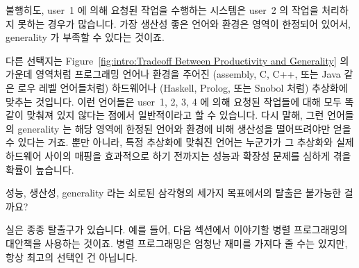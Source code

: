 불행히도, user~1 에 의해 요청된 작업을 수행하는 시스템은 user~2 의 작업을
처리하지 못하는 경우가 많습니다.
가장 생산성 좋은 언어와 환경은 영역이 한정되어 있어서, generality 가 부족할 수
있다는 것이죠.


다른 선택지는 Figure~\ref{fig:intro:Tradeoff Between Productivity and
Generality} 의 가운데 영역처럼 프로그래밍 언어나 환경을 주어진 (assembly, C,
C++, 또는 Java 같은 로우 레벨 언어들처럼) 하드웨어나 (Haskell, Prolog, 또는
Snobol 처럼) 추상화에 맞추는 것입니다.
이런 언어들은 user~1, 2, 3, 4 에 의해 요청된 작업들에 대해 모두 똑같이 맞춰져
있지 않다는 점에서 일반적이라고 할 수 있습니다.
다시 말해, 그런 언어들의 generality 는 해당 영역에 한정된 언어와 환경에 비해
생산성을 떨어뜨려야만 얻을 수 있다는 거죠.
뿐만 아니라, 특정 추상화에 맞춰진 언어는 누군가가 그 추상화와 실제 하드웨어
사이의 매핑을 효과적으로 하기 전까지는 성능과 확장성 문제를 심하게 겪을 확률이
높습니다.


성능, 생산성, generality 라는 쇠로된 삼각형의 세가지 목표에서의 탈출은 불가능한
걸까요?


실은 종종 탈출구가 있습니다. 예를 들어, 다음 섹션에서 이야기할 병렬
프로그래밍의 대안책을 사용하는 것이죠.
병렬 프로그래밍은 엄청난 재미를 가져다 줄 수는 있지만, 항상 최고의 선택인 건
아닙니다.


